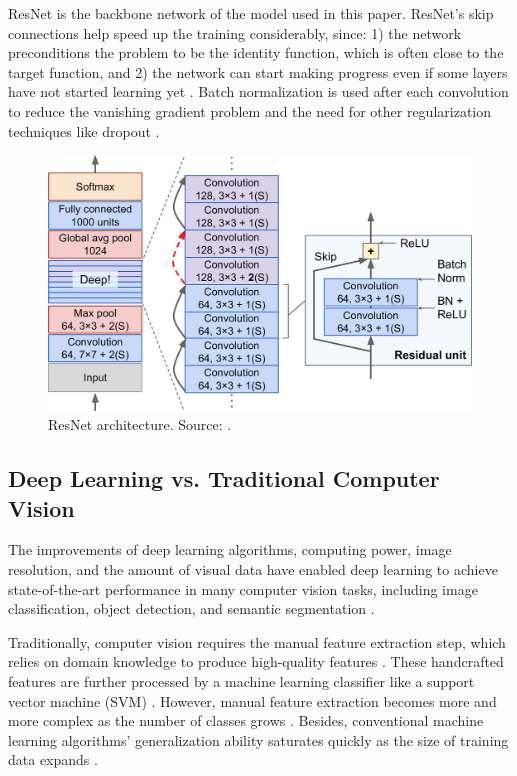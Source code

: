 \documentclass[a4paper, 11pt, oneside]{article}
\begin{document}
ResNet is the backbone network of the model used in this paper. ResNet's skip connections help speed up the training
considerably, since: 1) the network preconditions the problem to be the identity function, which is often close to the
target function, and 2) the network can start making progress even if some layers have not started learning yet
\cite{geron2019hands, he2016deep}. Batch normalization \cite{ioffe2015batch} is used after each convolution
to reduce the vanishing gradient problem \cite{hochreiter1998vanishing} and the need for other regularization techniques
like dropout \cite{srivastava2014dropout}.

\begin{figure}[ht]
  \begin{center}
    \includegraphics[width=.6\textwidth]{resnet.png}
  \end{center}
  \caption{ResNet architecture. Source: \cite{geron2019hands}.}
\end{figure}

\subsection{Deep Learning vs. Traditional Computer Vision}

\label{sec:dlvscv}

The improvements of deep learning algorithms, computing power, image resolution, and the amount of visual data have
enabled deep learning to achieve state-of-the-art performance in many computer vision tasks, including image
classification, object detection, and semantic segmentation \cite{qin2015underwater, voulodimos2018deep, o2019deep}.

Traditionally, computer vision requires the manual feature extraction step, which relies on domain knowledge to produce
high-quality features \cite{elgendy2020deep, zhao2019object, o2019deep}. These handcrafted features are further processed
by a machine learning classifier like a support vector machine (SVM) \cite{elgendy2020deep, zhao2019object, o2019deep}.
However, manual feature extraction becomes more and more complex as the number of classes grows \cite{o2019deep}.
Besides, conventional machine learning algorithms' generalization ability saturates quickly as the size of training data
expands \cite{qin2015underwater}.
\end{document}
